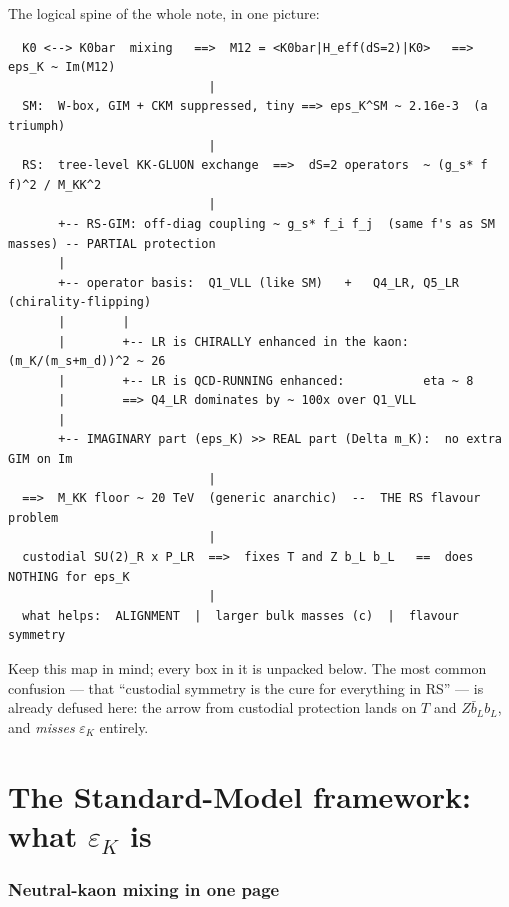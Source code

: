 \documentclass[11pt]{article}
\newcommand{\epsK}{\varepsilon_K}
\theoremstyle{definition}
\begin{document}
\noindent The logical spine of the whole note, in one picture:
\begin{footnotesize}
\begin{verbatim}
  K0 <--> K0bar  mixing   ==>  M12 = <K0bar|H_eff(dS=2)|K0>   ==>  eps_K ~ Im(M12)
                            |
  SM:  W-box, GIM + CKM suppressed, tiny ==> eps_K^SM ~ 2.16e-3  (a triumph)
                            |
  RS:  tree-level KK-GLUON exchange  ==>  dS=2 operators  ~ (g_s* f f)^2 / M_KK^2
                            |
       +-- RS-GIM: off-diag coupling ~ g_s* f_i f_j  (same f's as SM masses) -- PARTIAL protection
       |
       +-- operator basis:  Q1_VLL (like SM)   +   Q4_LR, Q5_LR  (chirality-flipping)
       |        |
       |        +-- LR is CHIRALLY enhanced in the kaon:  (m_K/(m_s+m_d))^2 ~ 26
       |        +-- LR is QCD-RUNNING enhanced:           eta ~ 8
       |        ==> Q4_LR dominates by ~ 100x over Q1_VLL
       |
       +-- IMAGINARY part (eps_K) >> REAL part (Delta m_K):  no extra GIM on Im
                            |
  ==>  M_KK floor ~ 20 TeV  (generic anarchic)  --  THE RS flavour problem
                            |
  custodial SU(2)_R x P_LR  ==>  fixes T and Z b_L b_L   ==  does NOTHING for eps_K
                            |
  what helps:  ALIGNMENT  |  larger bulk masses (c)  |  flavour symmetry
\end{verbatim}
\end{footnotesize}
\noindent Keep this map in mind; every box in it is unpacked below. The most
common confusion --- that ``custodial symmetry is the cure for everything in RS''
--- is already defused here: the arrow from custodial protection lands on $T$ and
$Z\bar b_L b_L$, and \emph{misses} $\epsK$ entirely.

\part{The Standard-Model framework: what $\varepsilon_K$ is}
\label{part:sm}

\section{Neutral-kaon mixing in one page}
\label{sec:mixing}
\end{document}
